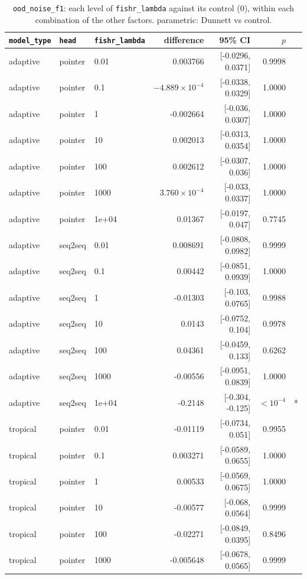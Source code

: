 \documentclass[10pt]{article}
\begin{document}
{\small
\begin{longtable}{lllrrrl}
\caption{\texttt{ood\_noise\_f1}: each level of \texttt{fishr\_lambda} against its control (0), within each combination of the other factors. parametric: Dunnett vs control.}\label{tab:control-ood_noise_f1}\\
\toprule
\texttt{model\_type} & \texttt{head} & \texttt{fishr\_lambda} & difference & 95\% CI & $p$ & \\
\midrule
\endhead
adaptive & pointer & 0.01 & 0.003766 & [-0.0296, 0.0371] & 0.9998 & \\
adaptive & pointer & 0.1 & $-4.889\times10^{-4}$ & [-0.0338, 0.0329] & 1.0000 & \\
adaptive & pointer & 1 & -0.002664 & [-0.036, 0.0307] & 1.0000 & \\
adaptive & pointer & 10 & 0.002013 & [-0.0313, 0.0354] & 1.0000 & \\
adaptive & pointer & 100 & 0.002612 & [-0.0307, 0.036] & 1.0000 & \\
adaptive & pointer & 1000 & $3.760\times10^{-4}$ & [-0.033, 0.0337] & 1.0000 & \\
adaptive & pointer & 1e+04 & 0.01367 & [-0.0197, 0.047] & 0.7745 & \\
adaptive & seq2seq & 0.01 & 0.008691 & [-0.0808, 0.0982] & 0.9999 & \\
adaptive & seq2seq & 0.1 & 0.00442 & [-0.0851, 0.0939] & 1.0000 & \\
adaptive & seq2seq & 1 & -0.01303 & [-0.103, 0.0765] & 0.9988 & \\
adaptive & seq2seq & 10 & 0.0143 & [-0.0752, 0.104] & 0.9978 & \\
adaptive & seq2seq & 100 & 0.04361 & [-0.0459, 0.133] & 0.6262 & \\
adaptive & seq2seq & 1000 & -0.00556 & [-0.0951, 0.0839] & 1.0000 & \\
adaptive & seq2seq & 1e+04 & -0.2148 & [-0.304, -0.125] & $<10^{-4}$ & *\\
tropical & pointer & 0.01 & -0.01119 & [-0.0734, 0.051] & 0.9955 & \\
tropical & pointer & 0.1 & 0.003271 & [-0.0589, 0.0655] & 1.0000 & \\
tropical & pointer & 1 & 0.00533 & [-0.0569, 0.0675] & 1.0000 & \\
tropical & pointer & 10 & -0.00577 & [-0.068, 0.0564] & 0.9999 & \\
tropical & pointer & 100 & -0.02271 & [-0.0849, 0.0395] & 0.8496 & \\
tropical & pointer & 1000 & -0.005648 & [-0.0678, 0.0565] & 0.9999 & \\

\end{longtable}}
\end{document}
